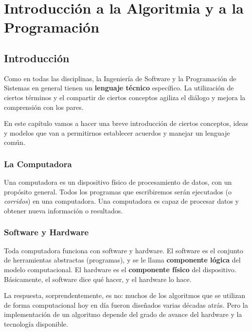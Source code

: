 \documentclass[
  letterpaper,
  DIV=11,
  numbers=noendperiod]{scrreprt}
\begin{document}

\chapter{Introducción a la Algoritmia y a la
Programación}\label{introducciuxf3n-a-la-algoritmia-y-a-la-programaciuxf3n}

\section{Introducción}\label{introducciuxf3n}

Como en todas las disciplinas, la Ingeniería de Software y la
Programación de Sistemas en general tienen un \textbf{lenguaje técnico}
específico. La utilización de ciertos términos y el compartir de ciertos
conceptos agiliza el diálogo y mejora la comprensión con los pares.

En este capítulo vamos a hacer una breve introducción de ciertos
conceptos, ideas y modelos que van a permitirnos establecer acuerdos y
manejar un lenguaje común.

\subsection{La Computadora}\label{la-computadora}

Una computadora es un dispositivo físico de procesamiento de datos, con
un propósito general. Todos los programas que escribiremos serán
ejecutados (o \emph{corridos}) en una computadora. Una computadora es
capaz de procesar datos y obtener nueva información o resultados.

\subsection{Software y Hardware}\label{software-y-hardware}

Toda computadora funciona con software y hardware. El software es el
conjunto de herramientas abstractas (programas), y se le llama
\textbf{componente lógica} del modelo computacional. El hardware es el
\textbf{componente físico} del dispositivo. Básicamente, el software
dice qué hacer, y el hardware lo hace.

\begin{tcolorbox}[enhanced jigsaw, colframe=quarto-callout-tip-color-frame, leftrule=.75mm, titlerule=0mm, left=2mm, bottomtitle=1mm, arc=.35mm, opacitybacktitle=0.6, toptitle=1mm, colbacktitle=quarto-callout-tip-color!10!white, opacityback=0, breakable, title=\textcolor{quarto-callout-tip-color}{\faLightbulb}\hspace{0.5em}{\textbf{¿Es indispensable tener una computadora para crear un
algoritmo?}\\
}, toprule=.15mm, rightrule=.15mm, colback=white, coltitle=black, bottomrule=.15mm]

La respuesta, sorprendentemente, es no: muchos de los algoritmos que se
utilizan de forma computacional hoy en día fueron diseñados varias
décadas atrás. Pero la implementación de un algoritmo depende del grado
de avance del hardware y la tecnología disponible.

\end{tcolorbox}
\end{document}
